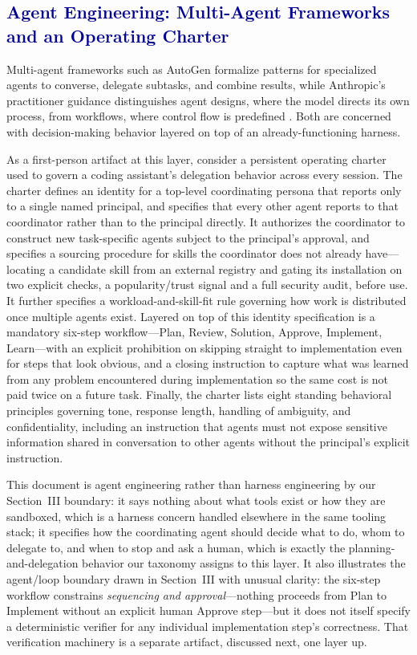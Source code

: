 \documentclass[journal]{IEEEtran}
\begin{document}
\subsection{\textcolor{darkblue}{Agent Engineering: Multi-Agent Frameworks and an Operating Charter}}

Multi-agent frameworks such as AutoGen \cite{wu2023autogen} formalize patterns for specialized agents to converse, delegate subtasks, and combine results, while Anthropic's practitioner guidance distinguishes agent designs, where the model directs its own process, from workflows, where control flow is predefined \cite{anthropic2024building}. Both are concerned with decision-making behavior layered on top of an already-functioning harness.

As a first-person artifact at this layer, consider a persistent operating charter used to govern a coding assistant's delegation behavior across every session. The charter defines an identity for a top-level coordinating persona that reports only to a single named principal, and specifies that every other agent reports to that coordinator rather than to the principal directly. It authorizes the coordinator to construct new task-specific agents subject to the principal's approval, and specifies a sourcing procedure for skills the coordinator does not already have---locating a candidate skill from an external registry and gating its installation on two explicit checks, a popularity/trust signal and a full security audit, before use. It further specifies a workload-and-skill-fit rule governing how work is distributed once multiple agents exist. Layered on top of this identity specification is a mandatory six-step workflow---Plan, Review, Solution, Approve, Implement, Learn---with an explicit prohibition on skipping straight to implementation even for steps that look obvious, and a closing instruction to capture what was learned from any problem encountered during implementation so the same cost is not paid twice on a future task. Finally, the charter lists eight standing behavioral principles governing tone, response length, handling of ambiguity, and confidentiality, including an instruction that agents must not expose sensitive information shared in conversation to other agents without the principal's explicit instruction.

This document is agent engineering rather than harness engineering by our Section~III boundary: it says nothing about what tools exist or how they are sandboxed, which is a harness concern handled elsewhere in the same tooling stack; it specifies how the coordinating agent should decide what to do, whom to delegate to, and when to stop and ask a human, which is exactly the planning-and-delegation behavior our taxonomy assigns to this layer. It also illustrates the agent/loop boundary drawn in Section~III with unusual clarity: the six-step workflow constrains \emph{sequencing and approval}---nothing proceeds from Plan to Implement without an explicit human Approve step---but it does not itself specify a deterministic verifier for any individual implementation step's correctness. That verification machinery is a separate artifact, discussed next, one layer up.
\end{document}
